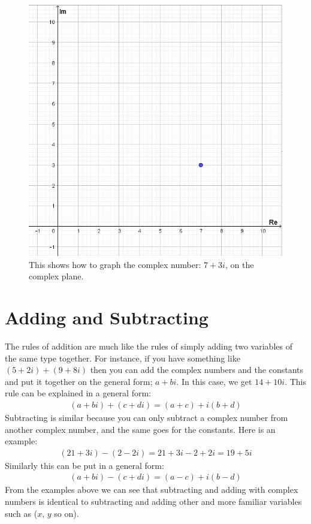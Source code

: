 \begin{figure}[H]
\begin{center}
  \includegraphics[scale=0.45]{fig/img/complex_plan.png}
   \caption{This shows how to graph the complex number: $7+3i$, on the complex plane.}
   \end{center}
\end{figure}


\section{Adding and Subtracting}
The rules of addition are much like the rules of simply adding two variables of the same type together. For instance, if you have something like $(5+2i)+(9+8i)$ then you can add the complex numbers and the constants and put it together on the general form; $a+bi$. In this case, we get $14+10i$. This rule can be explained in a general form: 
\begin{align*}
(a + bi) + (c + di) = (a + c) + i(b + d)
\end{align*}
Subtracting is similar because you can only subtract a complex number from another complex number, and the same goes for the constants. Here is an example:
\begin{align*}
(21 + 3i) - (2 - 2i) = 21 + 3i - 2 + 2i = 19 + 5i
\end{align*}
Similarly this can be put in a general form:
\begin{align*}
(a + bi) - (c + di) = (a - c) + i(b - d)
\end{align*}
From the examples above we can see that subtracting and adding with complex numbers is identical to subtracting and adding other and more familiar variables such as ($x$, $y$ so on).

